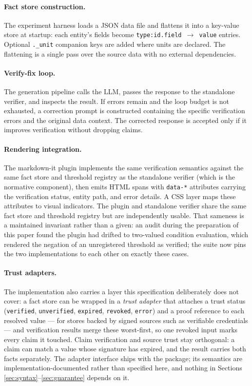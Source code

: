 \documentclass[11pt,a4paper]{article}
\begin{document}
\paragraph{Fact store construction.} The experiment harness loads a JSON data file and flattens it into a key-value store at startup: each entity's fields become \texttt{type:id.field $\rightarrow$ value} entries. Optional \texttt{.\_unit} companion keys are added where units are declared. The flattening is a single pass over the source data with no external dependencies.

\paragraph{Verify-fix loop.} The generation pipeline calls the LLM, passes the response to the standalone verifier, and inspects the result. If errors remain and the loop budget is not exhausted, a correction prompt is constructed containing the specific verification errors and the original data context. The corrected response is accepted only if it improves verification without dropping claims.

\paragraph{Rendering integration.} The markdown-it plugin implements the same verification semantics against the same fact store and threshold registry as the standalone verifier (which is the normative component), then emits HTML spans with \texttt{data-*} attributes carrying the verification status, entity path, and error details. A CSS layer maps these attributes to visual indicators. The plugin and standalone verifier share the same fact store and threshold registry but are independently usable. That sameness is a maintained invariant rather than a given: an audit during the preparation of this paper found the plugin had drifted to two-valued condition evaluation, which rendered the negation of an unregistered threshold as verified; the suite now pins the two implementations to each other on exactly these cases.

\paragraph{Trust adapters.} The implementation also carries a layer this specification deliberately does not cover: a fact store can be wrapped in a \textit{trust adapter} that attaches a trust status (\texttt{verified}, \texttt{unverified}, \texttt{expired}, \texttt{revoked}, \texttt{error}) and a proof reference to each resolved value --- for stores backed by signed sources such as verifiable credentials --- and verification results merge these worst-first, so one revoked input marks every claim it touched. Claim verification and source trust stay orthogonal: a claim can match a value whose signature has expired, and the result carries both facts separately. The adapter interface ships with the package; its semantics are implementation-documented rather than specified here, and nothing in Sections \ref{sec:syntax}--\ref{sec:guarantee} depends on it.
\end{document}
